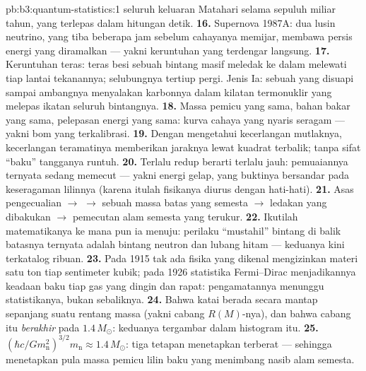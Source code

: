 \begin{solution}{pb:b3:quantum-statistics:1}
seluruh keluaran Matahari selama sepuluh miliar tahun, yang terlepas
dalam hitungan detik.
\textbf{16.} Supernova 1987A: dua lusin neutrino, yang tiba beberapa
jam sebelum cahayanya memijar, membawa persis energi yang diramalkan
--- yakni keruntuhan yang terdengar langsung.
\textbf{17.} Keruntuhan teras: teras besi sebuah bintang masif meledak
ke dalam melewati tiap lantai tekanannya; selubungnya tertiup pergi.
Jenis Ia: sebuah  yang disuapi sampai ambangnya menyalakan
karbonnya dalam kilatan termonuklir yang melepas ikatan seluruh bintangnya.
\textbf{18.} Massa pemicu yang sama, bahan bakar yang sama, pelepasan
energi yang sama: kurva cahaya yang nyaris seragam --- yakni bom yang
terkalibrasi.
\textbf{19.} Dengan mengetahui kecerlangan mutlaknya, kecerlangan
teramatinya memberikan jaraknya lewat kuadrat terbalik; tanpa sifat
``baku'' tangganya runtuh.
\textbf{20.} Terlalu redup berarti terlalu jauh: pemuaiannya ternyata
sedang memecut --- yakni energi gelap, yang buktinya bersandar pada
keseragaman lilinnya (karena itulah fisikanya diurus dengan hati-hati).
\textbf{21.} Asas pengecualian $\to$  $\to$ sebuah
massa batas yang semesta $\to$ ledakan yang dibakukan $\to$ pemecutan
alam semesta yang terukur.
\textbf{22.} Ikutilah matematikanya ke mana pun ia menuju: perilaku
``mustahil'' bintang di balik batasnya ternyata adalah bintang neutron
dan lubang hitam --- keduanya kini terkatalog ribuan.
\textbf{23.} Pada 1915 tak ada fisika yang dikenal mengizinkan materi
satu ton tiap sentimeter kubik; pada 1926 statistika Fermi--Dirac
menjadikannya keadaan baku tiap gas yang dingin dan rapat: pengamatannya
menunggu statistikanya, bukan sebaliknya.
\textbf{24.} Bahwa katai berada secara mantap sepanjang suatu rentang
massa (yakni cabang $R(M)$-nya), dan bahwa cabang itu \emph{berakhir}
pada $1.4\,M_\odot$: keduanya tergambar dalam histogram itu.
\textbf{25.} $(\hbar c/Gm_{\text{n}}^2)^{3/2}m_{\text{n}} \approx
1.4\,M_\odot$: tiga tetapan menetapkan  terberat ---
sehingga menetapkan pula massa pemicu lilin baku yang menimbang
nasib alam semesta.
\end{solution}
